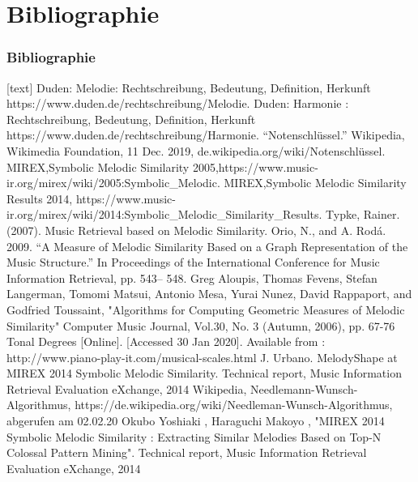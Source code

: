 \documentclass{beamer}
\begin{document}
	\section{Bibliographie}
	\begin{frame}[allowframebreaks]
		\frametitle{Bibliographie}
		\begin{thebibliography}{5}
			[text]
			 Duden: Melodie: Rechtschreibung, Bedeutung, Definition, Herkunft
			https://www.duden.de/rechtschreibung/Melodie.
			 Duden: Harmonie : Rechtschreibung, Bedeutung, Definition, Herkunft
			https://www.duden.de/rechtschreibung/Harmonie.
			 “Notenschlüssel.” Wikipedia, Wikimedia Foundation, 11 Dec. 2019, de.wikipedia.org/wiki/Notenschlüssel.
			 MIREX,Symbolic Melodic Similarity 2005,https://www.music-ir.org/mirex/wiki/2005:Symbolic\_Melodic.
			 MIREX,Symbolic Melodic Similarity Results 2014, https://www.music-ir.org/mirex/wiki/2014:Symbolic\_Melodic\_Similarity\_Results.
			 Typke, Rainer. (2007). Music Retrieval based on Melodic Similarity.
			 Orio, N., and A. Rodá. 2009. “A Measure of Melodic Similarity Based on a Graph Representation of the Music Structure.” In Proceedings of the International Conference for Music Information Retrieval, pp. 543– 548.
			 Greg Aloupis, Thomas Fevens, Stefan Langerman, Tomomi Matsui, Antonio Mesa, Yurai Nunez, David Rappaport, and Godfried Toussaint, "Algorithms for Computing Geometric Measures of Melodic Similarity" Computer Music Journal, Vol.30, No. 3 (Autumn, 2006), pp. 67-76
			 Tonal Degrees [Online]. [Accessed 30 Jan 2020]. Available from : http://www.piano-play-it.com/musical-scales.html
			 J. Urbano. MelodyShape at MIREX 2014 Symbolic
            Melodic Similarity. Technical report, Music Information Retrieval Evaluation eXchange, 2014
           	 Wikipedia, Needlemann-Wunsch-Algorithmus, https://de.wikipedia.org/wiki/Needleman-Wunsch-Algorithmus, abgerufen am 02.02.20
           	 Okubo Yoshiaki , Haraguchi Makoyo , "MIREX 2014 Symbolic Melodic Similarity : Extracting Similar Melodies Based on Top-N Colossal Pattern Mining". Technical report, Music Information Retrieval Evaluation eXchange, 2014
		\end{thebibliography}
	\end{frame}
\end{document}
